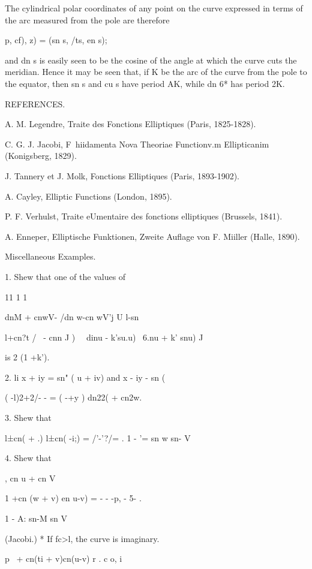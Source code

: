 The cylindrical polar coordinates of any point on the curve expressed
in terms of the arc measured from the pole are therefore

 p, cf), z) = (sn s, /ts, en s);

and dn s is easily seen to be the cosine of the angle at which the
curve cuts the meridian. Hence it may be seen that, if K be the arc of
the curve from the pole to the equator, then sn s and cu s have period
AK, while dn 6* has period 2K.

REFERENCES.

A. M. Legendre, Traite des Fonctions Elliptiques (Paris, 1825-1828).

C. G. J. Jacobi, F\ hiidamenta Nova Theoriae Functionv.m Ellipticanim
(Konigsberg, 1829).

J. Tannery et J. Molk, Fonctions Elliptiques (Paris, 1893-1902).

A. Cayley, Elliptic Functions (London, 1895).

P. F. Verhulst, Traite eUmentaire des fonctions elliptiques (Brussels,
1841).

A. Enneper, Elliptische Funktionen, Zweite Auflage von F. Miiller
(Halle, 1890).

Miscellaneous Examples.

1. Shew that one of the values of

11 1 1

dnM + cnwV- /dn w-cn wV'j U l-sn%

l+cn?t / \ - cnn J ) \ \ dinu - k'su.u) \ 6.nu + k' snu) J

is 2 (1 +k'). 

2. li x + iy = sn" ( u + iv) and x - iy - sn (%

 ( -l)2+2/- - = ( -+y ) dn22( + cn2w.


3. Shew that

 l±cn( + .) l±cn( -i;) = /'-'?/= . 1 - '= sn w sn- V

4. Shew that

, cn u + cn V

1 +cn (w + v) en u-v) = - - -p, - 5- .

  1 - A: sn-M sn V

(Jacobi.) * If fc>l, the curve is imaginary.

%
%

p \ + cn(ti + v)cn(u-v) r . c o, i

